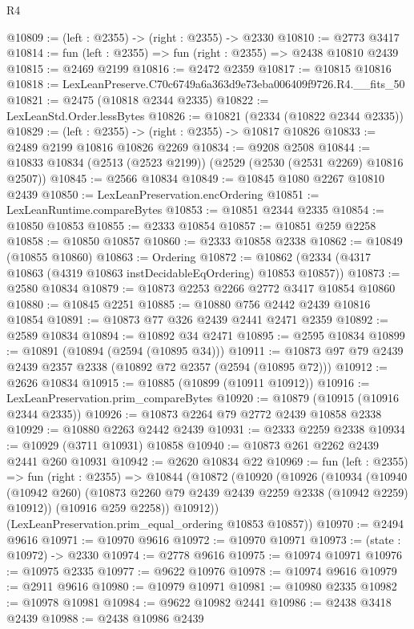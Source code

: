 \begin{lexlean}{R4}
\begin{coremodule}
@10809 := (left : @2355) -> (right : @2355) -> @2330
@10810 := @2773 @3417
@10814 := fun (left : @2355) => fun (right : @2355) => @2438 @10810 @2439
@10815 := @2469 @2199
@10816 := @2472 @2359
@10817 := @10815 @10816
@10818 := LexLeanPreserve.C70c6749a6a363d9e73eba006409f9726.R4.__fits_50
@10821 := @2475 (@10818 @2344 @2335)
@10822 := LexLeanStd.Order.lessBytes
@10826 := @10821 (@2334 (@10822 @2344 @2335))
@10829 := (left : @2355) -> (right : @2355) -> @10817 @10826
@10833 := @2489 @2199 @10816 @10826 @2269
@10834 := @9208 @2508
@10844 := @10833 @10834 (@2513 (@2523 @2199)) (@2529 (@2530 (@2531 @2269) @10816 @2507))
@10845 := @2566 @10834
@10849 := @10845 @1080 @2267 @10810 @2439
@10850 := LexLeanPreservation.encOrdering
@10851 := LexLeanRuntime.compareBytes
@10853 := @10851 @2344 @2335
@10854 := @10850 @10853
@10855 := @2333 @10854
@10857 := @10851 @259 @2258
@10858 := @10850 @10857
@10860 := @2333 @10858 @2338
@10862 := @10849 (@10855 @10860)
@10863 := Ordering
@10872 := @10862 (@2334 (@4317 @10863 (@4319 @10863 instDecidableEqOrdering) @10853 @10857))
@10873 := @2580 @10834
@10879 := @10873 @2253 @2266 @2772 @3417 @10854 @10860
@10880 := @10845 @2251
@10885 := @10880 @756 @2442 @2439 @10816 @10854
@10891 := @10873 @77 @326 @2439 @2441 @2471 @2359
@10892 := @2589 @10834
@10894 := @10892 @34 @2471
@10895 := @2595 @10834
@10899 := @10891 (@10894 (@2594 (@10895 @34)))
@10911 := @10873 @97 @79 @2439 @2439 @2357 @2338 (@10892 @72 @2357 (@2594 (@10895 @72)))
@10912 := @2626 @10834
@10915 := @10885 (@10899 (@10911 @10912))
@10916 := LexLeanPreservation.prim_compareBytes
@10920 := @10879 (@10915 (@10916 @2344 @2335))
@10926 := @10873 @2264 @79 @2772 @2439 @10858 @2338
@10929 := @10880 @2263 @2442 @2439
@10931 := @2333 @2259 @2338
@10934 := @10929 (@3711 @10931) @10858
@10940 := @10873 @261 @2262 @2439 @2441 @260 @10931
@10942 := @2620 @10834 @22
@10969 := fun (left : @2355) =>
  fun (right : @2355) =>
  @10844
    (@10872
      (@10920
        (@10926
          (@10934
            (@10940 (@10942 @260) (@10873 @2260 @79 @2439 @2439 @2259 @2338 (@10942 @2259) @10912))
            (@10916 @259 @2258))
          @10912))
      (LexLeanPreservation.prim_equal_ordering @10853 @10857))
@10970 := @2494 @9616
@10971 := @10970 @9616
@10972 := @10970 @10971
@10973 := (state : @10972) -> @2330
@10974 := @2778 @9616
@10975 := @10974 @10971
@10976 := @10975 @2335
@10977 := @9622 @10976
@10978 := @10974 @9616
@10979 := @2911 @9616
@10980 := @10979 @10971
@10981 := @10980 @2335
@10982 := @10978 @10981
@10984 := @9622 @10982 @2441
@10986 := @2438 @3418 @2439
@10988 := @2438 @10986 @2439

\end{coremodule}
\end{lexlean}
